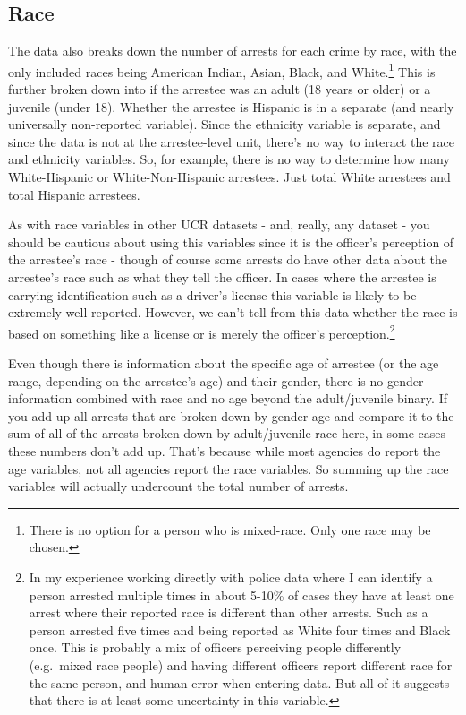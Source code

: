 \documentclass[
]{krantz}
\begin{document}
\subsection{Race}\label{race}

The data also breaks down the number of arrests for each
crime by race, with the only included races being American
Indian, Asian, Black, and White.\footnote{There is no option
  for a person who is mixed-race. Only one race may be
  chosen.} This is further broken down into if the arrestee
was an adult (18 years or older) or a juvenile (under 18).
Whether the arrestee is Hispanic is in a separate (and
nearly universally non-reported variable). Since the
ethnicity variable is separate, and since the data is not at
the arrestee-level unit, there's no way to interact the race
and ethnicity variables. So, for example, there is no way to
determine how many White-Hispanic or White-Non-Hispanic
arrestees. Just total White arrestees and total Hispanic
arrestees.

As with race variables in other UCR datasets - and, really,
any dataset - you should be cautious about using this
variables since it is the officer's perception of the
arrestee's race - though of course some arrests do have
other data about the arrestee's race such as what they tell
the officer. In cases where the arrestee is carrying
identification such as a driver's license this variable is
likely to be extremely well reported. However, we can't tell
from this data whether the race is based on something like a
license or is merely the officer's perception.\footnote{In
  my experience working directly with police data where I
  can identify a person arrested multiple times in about
  5-10\% of cases they have at least one arrest where their
  reported race is different than other arrests. Such as a
  person arrested five times and being reported as White
  four times and Black once. This is probably a mix of
  officers perceiving people differently (e.g.~mixed race
  people) and having different officers report different
  race for the same person, and human error when entering
  data. But all of it suggests that there is at least some
  uncertainty in this variable.}

Even though there is information about the specific age of
arrestee (or the age range, depending on the arrestee's age)
and their gender, there is no gender information combined
with race and no age beyond the adult/juvenile binary. If
you add up all arrests that are broken down by gender-age
and compare it to the sum of all of the arrests broken down
by adult/juvenile-race here, in some cases these numbers
don't add up. That's because while most agencies do report
the age variables, not all agencies report the race
variables. So summing up the race variables will actually
undercount the total number of arrests.
\end{document}
